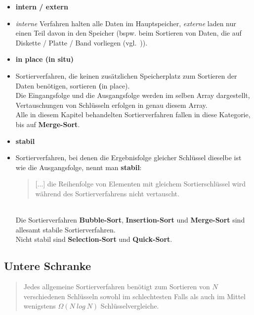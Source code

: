 \begin{itemize}
    \item \textbf{intern / extern}
    \item[] \textit{interne} Verfahren halten alle Daten im Hauptspeicher, \textit{externe} laden nur einen Teil davon in den Speicher (bspw. beim Sortieren von Daten, die auf Diskette / Platte / Band vorliegen (vgl.~\cite[80]{OW17b})).
    \item \textbf{in place (in situ)}
    \item [] Sortierverfahren, die keinen zusätzlichen Speicherplatz zum Sortieren der Daten benötigen, sortieren \textbf(in place).\\
    Die Eingangsfolge und die Ausgangsfolge werden im selben Array dargestellt, Vertauschungen von Schlüsseln erfolgen in genau diesem Array.\\
    Alle in diesem Kapitel behandelten Sortierverfahren fallen in diese Kategorie, bis auf \textbf{Merge-Sort}.
    \item \textbf{stabil}
    \item[] Sortierverfahren, bei denen die Ergebnisfolge gleicher Schlüssel dieselbe ist wie die Ausgangsfolge, nennt man \textbf{stabil}:\blockquote[{\cite[164]{OW17b}}]{
        [...] die Reihenfolge von Elementen mit gleichem Sortierschlüssel wird während des Sortierverfahrens nicht vertauscht.
    }.\\
    Die Sortierverfahren \textbf{Bubble-Sort}, \textbf{Insertion-Sort} und \textbf{Merge-Sort} sind allesamt stabile Sortierverfahren.\\
    Nicht stabil sind \textbf{Selection-Sort} und \textbf{Quick-Sort}.
\end{itemize}


\subsection{Untere Schranke}

\blockquote[{\cite[154, Satz2.4]{OW17b}}]{
    Jedes allgemeine Sortierverfahren benötigt zum Sortieren von $N$ verschiedenen Schlüsseln sowohl im schlechtesten Falls als auch im Mittel wenigstens $\Omega(N\ log\ N)$ Schlüsselvergleiche.
}.